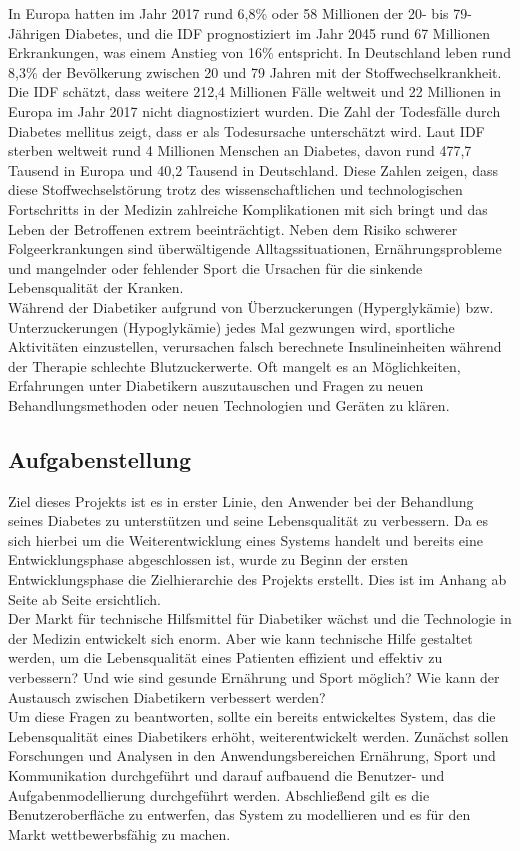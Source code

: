 	In Europa hatten im Jahr 2017 rund 6,8\% oder 58 Millionen der 20- bis 79-Jährigen Diabetes, und die IDF prognostiziert im Jahr 2045 rund 67 Millionen Erkrankungen, was einem Anstieg von 16\% entspricht. In Deutschland leben rund 8,3\% der Bevölkerung zwischen 20 und 79 Jahren mit der Stoffwechselkrankheit. Die IDF schätzt, dass weitere 212,4 Millionen Fälle weltweit und 22 Millionen in Europa im Jahr 2017 nicht diagnostiziert wurden. \cite[S. 110 ff.]{IDF} Die Zahl der Todesfälle durch Diabetes mellitus zeigt, dass er als Todesursache unterschätzt wird. Laut IDF sterben weltweit rund 4 Millionen Menschen an Diabetes, davon rund 477,7 Tausend in Europa und 40,2 Tausend in Deutschland. \cite[S. 46]{IDF} Diese Zahlen zeigen, dass diese Stoffwechselstörung trotz des wissenschaftlichen und technologischen Fortschritts in der Medizin zahlreiche Komplikationen mit sich bringt und das Leben der Betroffenen extrem beeinträchtigt. Neben dem Risiko schwerer Folgeerkrankungen sind überwältigende Alltagssituationen, Ernährungsprobleme und mangelnder oder fehlender Sport die Ursachen für die sinkende Lebensqualität der Kranken.\\
	Während der Diabetiker aufgrund von Überzuckerungen (Hyperglykämie) bzw. Unterzuckerungen (Hypoglykämie) jedes Mal gezwungen wird, sportliche Aktivitäten einzustellen, verursachen falsch berechnete Insulineinheiten während der Therapie schlechte Blutzuckerwerte. Oft mangelt es an Möglichkeiten, Erfahrungen unter Diabetikern auszutauschen und Fragen zu neuen Behandlungsmethoden oder neuen Technologien und Geräten zu klären.
\subsection{Aufgabenstellung}
	Ziel dieses Projekts ist es in erster Linie, den Anwender bei der Behandlung seines Diabetes zu unterstützen und seine Lebensqualität zu verbessern. Da es sich hierbei um die Weiterentwicklung eines Systems handelt und bereits eine Entwicklungsphase abgeschlossen ist, wurde zu Beginn der ersten Entwicklungsphase die Zielhierarchie des Projekts erstellt. Dies ist im Anhang ab Seite ab Seite \pageref{section:Zielhierarchie} ersichtlich. \\
	Der Markt für technische Hilfsmittel für Diabetiker wächst und die Technologie in der Medizin entwickelt sich enorm. Aber wie kann technische Hilfe gestaltet werden, um die Lebensqualität eines Patienten effizient und effektiv zu verbessern? Und wie sind gesunde Ernährung und Sport möglich? Wie kann der Austausch zwischen Diabetikern verbessert werden?\\
	Um diese Fragen zu beantworten, sollte ein bereits entwickeltes System, das die Lebensqualität eines Diabetikers erhöht, weiterentwickelt werden. Zunächst sollen Forschungen und Analysen in den Anwendungsbereichen \glqq Ernährung\grqq{}, \glqq Sport\grqq{} und \glqq Kommunikation\grqq{} durchgeführt und darauf aufbauend die Benutzer- und Aufgabenmodellierung durchgeführt werden. Abschließend gilt es die Benutzeroberfläche zu entwerfen, das System zu modellieren und es für den Markt wettbewerbsfähig zu machen.
